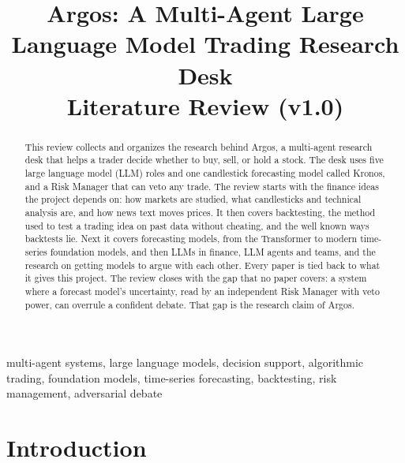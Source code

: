 \documentclass[conference]{IEEEtran}
\newcommand{\sys}{Argos}
\begin{document}
\title{\sys{}: A Multi-Agent Large Language Model Trading Research Desk\\
\large Literature Review (v1.0)}

\author{
}

\maketitle

\begin{abstract}
This review collects and organizes the research behind \sys{}, a multi-agent research desk that helps a trader decide whether to buy, sell, or hold a stock. The desk uses five large language model (LLM) roles and one candlestick forecasting model called Kronos, and a Risk Manager that can veto any trade. The review starts with the finance ideas the project depends on: how markets are studied, what candlesticks and technical analysis are, and how news text moves prices. It then covers backtesting, the method used to test a trading idea on past data without cheating, and the well known ways backtests lie. Next it covers forecasting models, from the Transformer to modern time-series foundation models, and then LLMs in finance, LLM agents and teams, and the research on getting models to argue with each other. Every paper is tied back to what it gives this project. The review closes with the gap that no paper covers: a system where a forecast model's uncertainty, read by an independent Risk Manager with veto power, can overrule a confident debate. That gap is the research claim of \sys{}.
\end{abstract}

\begin{IEEEkeywords}
multi-agent systems, large language models, decision support, algorithmic trading, foundation models, time-series forecasting, backtesting, risk management, adversarial debate
\end{IEEEkeywords}

\section{Introduction}
\end{document}
